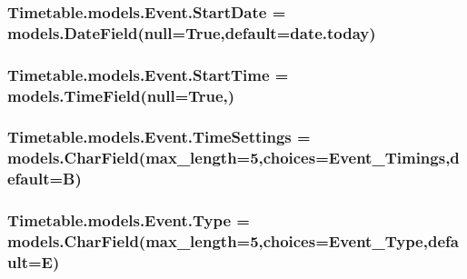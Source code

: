 \subsubsection[{\texorpdfstring{Start\+Date}{StartDate}}]{\setlength{\rightskip}{0pt plus 5cm}Timetable.\+models.\+Event.\+Start\+Date = models.\+Date\+Field(null=True,default=date.\+today)\hspace{0.3cm}{\ttfamily [static]}}\hypertarget{classTimetable_1_1models_1_1Event_adfecfcec3bf86bc596b0ae87f8dad74d}{}\label{classTimetable_1_1models_1_1Event_adfecfcec3bf86bc596b0ae87f8dad74d}
\subsubsection[{\texorpdfstring{Start\+Time}{StartTime}}]{\setlength{\rightskip}{0pt plus 5cm}Timetable.\+models.\+Event.\+Start\+Time = models.\+Time\+Field(null=True,)\hspace{0.3cm}{\ttfamily [static]}}\hypertarget{classTimetable_1_1models_1_1Event_ad4685e5d780c691518156ec2d6984ce9}{}\label{classTimetable_1_1models_1_1Event_ad4685e5d780c691518156ec2d6984ce9}
\subsubsection[{\texorpdfstring{Time\+Settings}{TimeSettings}}]{\setlength{\rightskip}{0pt plus 5cm}Timetable.\+models.\+Event.\+Time\+Settings = models.\+Char\+Field(max\+\_\+length=5,choices={\bf Event\+\_\+\+Timings},default=\textquotesingle{}B\textquotesingle{})\hspace{0.3cm}{\ttfamily [static]}}\hypertarget{classTimetable_1_1models_1_1Event_a5efd9cdcfa42baa6c93dce2c286c52b4}{}\label{classTimetable_1_1models_1_1Event_a5efd9cdcfa42baa6c93dce2c286c52b4}
\subsubsection[{\texorpdfstring{Type}{Type}}]{\setlength{\rightskip}{0pt plus 5cm}Timetable.\+models.\+Event.\+Type = models.\+Char\+Field(max\+\_\+length=5,choices={\bf Event\+\_\+\+Type},default=\textquotesingle{}E\textquotesingle{})\hspace{0.3cm}{\ttfamily [static]}}\hypertarget{classTimetable_1_1models_1_1Event_a3b4b7e0329617e3e6e482b3a2d77e648}{}\label{classTimetable_1_1models_1_1Event_a3b4b7e0329617e3e6e482b3a2d77e648}
